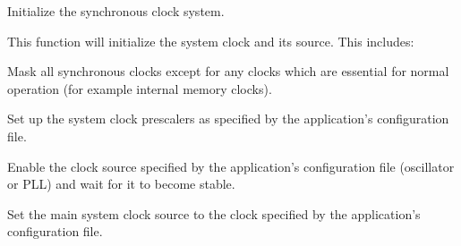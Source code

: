 \-Initialize the synchronous clock system. 

\-This function will initialize the system clock and its source. \-This includes\-:
\begin{DoxyItemize}
\item \-Mask all synchronous clocks except for any clocks which are essential for normal operation (for example internal memory clocks).
\item \-Set up the system clock prescalers as specified by the application's configuration file.
\item \-Enable the clock source specified by the application's configuration file (oscillator or \-P\-L\-L) and wait for it to become stable.
\item \-Set the main system clock source to the clock specified by the application's configuration file.
\end{DoxyItemize}

